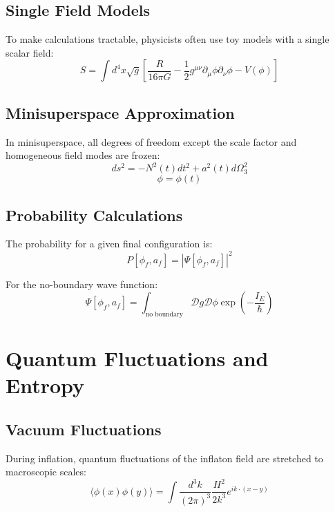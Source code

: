 \documentclass[12pt,a4paper]{article}
\begin{document}
\subsection{Single Field Models}

To make calculations tractable, physicists often use toy models with a single scalar field:
\begin{equation}
S = \int d^4x \sqrt{g}\left[\frac{R}{16\pi G} - \frac{1}{2}g^{\mu\nu}\partial_\mu\phi\partial_\nu\phi - V(\phi)\right]
\end{equation}

\subsection{Minisuperspace Approximation}

In minisuperspace, all degrees of freedom except the scale factor and homogeneous field modes are frozen:
\begin{equation}
ds^2 = -N^2(t)dt^2 + a^2(t)d\Omega_3^2
\end{equation}
\begin{equation}
\phi = \phi(t)
\end{equation}

\subsection{Probability Calculations}

The probability for a given final configuration is:
\begin{equation}
P[\phi_f, a_f] = |\Psi[\phi_f, a_f]|^2
\end{equation}

For the no-boundary wave function:
\begin{equation}
\Psi[\phi_f, a_f] = \int_{\text{no boundary}} \mathcal{D}g \mathcal{D}\phi \exp\left(-\frac{I_E}{\hbar}\right)
\end{equation}

\section{Quantum Fluctuations and Entropy}

\subsection{Vacuum Fluctuations}

During inflation, quantum fluctuations of the inflaton field are stretched to macroscopic scales:
\begin{equation}
\langle\phi(x)\phi(y)\rangle = \int \frac{d^3k}{(2\pi)^3} \frac{H^2}{2k^3} e^{ik \cdot (x-y)}
\end{equation}
\end{document}
